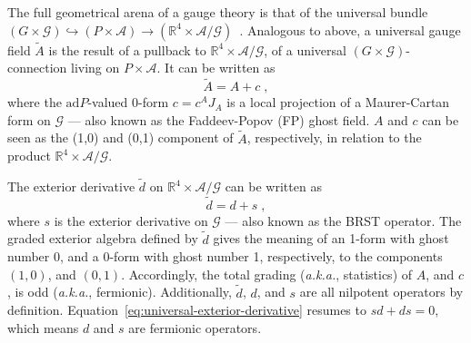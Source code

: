 \documentclass[main.tex]{subfiles}
\begin{document}
The full geometrical arena of a gauge theory is that of the universal bundle $\left( G\times\mathcal{G} \right) \hookrightarrow \left( P \times \mathcal{A} \right) \rightarrow \left( \mathbb{R}^4\times\mathcal{A}/\mathcal{G} \right)$~\cite{baulieu1985a,baulieu1988a}. Analogous to above, a universal gauge field $\tilde{A}$ is the result of a pullback to $\mathbb{R}^4 \times \mathcal{A}/\mathcal{G}$, of a universal $\left( G \times \mathcal{G} \right)$-connection living on $P \times \mathcal{A}$. It can be written as
\begin{equation}
  \tilde{A} = A + c \;,
\end{equation}
where the $\mathrm{ad}P$-valued 0-form $c=c^A J_A$ is a local projection of a Maurer-Cartan form on $ \mathcal{G} $ --- also known as the Faddeev-Popov (FP) ghost field. $A$ and $c$ can be seen as the (1,0) and (0,1) component of $\tilde{A}$, respectively, in relation to the product $\mathbb{R}^4 \times \mathcal{A}/\mathcal{G}$.

The exterior derivative $\tilde{d}$ on $\mathbb{R}^4 \times \mathcal{A}/\mathcal{G}$ can be written as
\begin{equation}\label{eq:universal-exterior-derivative}
  \tilde{d} = d + s \;,
\end{equation}
where $s$ is the exterior derivative on $\mathcal{G}$ --- also known as the BRST operator. The graded exterior algebra defined by $\tilde{d}$ gives the meaning of an 1-form with ghost number 0, and a 0-form with ghost number 1, respectively, to the components $ \left( 1,0 \right) $, and $ \left( 0,1 \right) $. Accordingly, the total grading (\textit{a.k.a.}, statistics) of $A$, and $c$, is odd (\textit{a.k.a.}, fermionic). Additionally, $\tilde{d}$, $d$, and $s$ are all nilpotent operators by definition. Equation~\eqref{eq:universal-exterior-derivative} resumes to $sd+ds=0$, which means $d$ and $s$ are fermionic operators.
\end{document}
